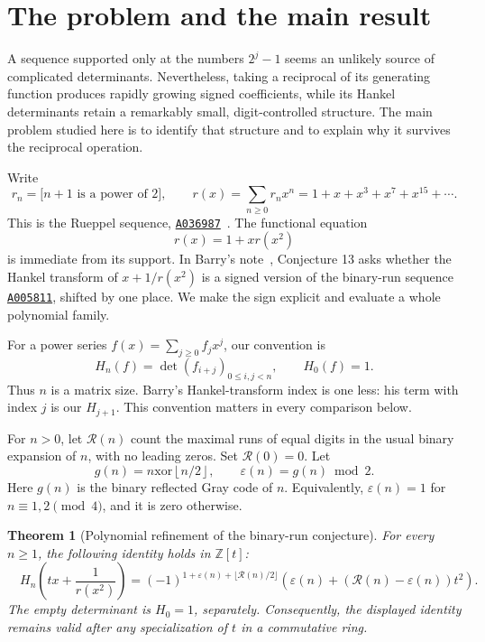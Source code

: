 \documentclass[11pt,a4paper]{article}
\numberwithin{equation}{section}
\newtheorem{theorem}{Theorem}[section]
\theoremstyle{definition}
\theoremstyle{remark}
\newcommand{\Z}{\mathbb Z}
\newcommand{\Runs}{\mathcal R}
\newcommand{\eps}{\varepsilon}
\newcommand{\floor}[1]{\left\lfloor #1\right\rfloor}
\newcommand{\ind}[1]{\boldsymbol{[}#1\boldsymbol{]}}
\newcommand{\oeis}[1]{\href{https://oeis.org/#1}{\texttt{#1}}}
\begin{document}
\section{The problem and the main result}\label{sec:problem}

A sequence supported only at the numbers $2^j-1$ seems an unlikely source
of complicated determinants. Nevertheless, taking a reciprocal of its
generating function produces rapidly growing signed coefficients, while
its Hankel determinants retain a remarkably small, digit-controlled
structure. The main problem studied here is to identify that structure
and to explain why it survives the reciprocal operation.

Write
\begin{equation}\label{eq:rdef}
 r_n=\ind{n+1\text{ is a power of }2},\qquad
 r(x)=\sum_{n\ge0}r_nx^n=1+x+x^3+x^7+x^{15}+\cdots.
\end{equation}
This is the Rueppel sequence, \oeis{A036987}~\cite{oeisrueppel}. The functional equation
\begin{equation}\label{eq:rfunctional}
 r(x)=1+xr(x^2)
\end{equation}
is immediate from its support. In Barry's note~\cite{barry2021},
Conjecture 13 asks whether the Hankel transform of $x+1/r(x^2)$ is a
signed version of the binary-run sequence \oeis{A005811}, shifted by one
place. We make the sign explicit and evaluate a whole polynomial family.

For a power series $f(x)=\sum_{j\ge0}f_jx^j$, our convention is
\begin{equation}\label{eq:hdef}
 H_n(f)=\det(f_{i+j})_{0\le i,j<n},\qquad H_0(f)=1.
\end{equation}
Thus $n$ is a matrix size. Barry's Hankel-transform index is one less:
his term with index $j$ is our $H_{j+1}$. This convention matters in every
comparison below.

For $n>0$, let $\Runs(n)$ count the maximal runs of equal digits in the
usual binary expansion of $n$, with no leading zeros. Set $\Runs(0)=0$.
Let
\begin{equation}\label{eq:epsilon}
 g(n)=n\mathbin{\mathrm{xor}}\floor{n/2},\qquad
 \eps(n)=g(n)\bmod2.
\end{equation}
Here $g(n)$ is the binary reflected Gray code of $n$. Equivalently,
$\eps(n)=1$ for $n\equiv1,2\pmod4$, and it is zero otherwise.

\begin{theorem}[Polynomial refinement of the binary-run conjecture]\label{thm:main}
For every $n\ge1$, the following identity holds in $\Z[t]$:
\begin{equation}\label{eq:main}
\boxed{\quad
 H_n\!\left(t x+\frac1{r(x^2)}\right)
 =(-1)^{1+\eps(n)+\lfloor\Runs(n)/2\rfloor}
 \left(\eps(n)+(\Runs(n)-\eps(n))t^2\right).
 \quad}
\end{equation}
The empty determinant is $H_0=1$, separately. Consequently, the displayed
identity remains valid after any specialization of $t$ in a commutative
ring.
\end{theorem}
\end{document}
